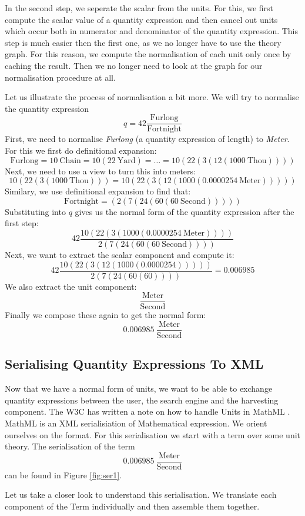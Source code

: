 In the second step, we seperate the scalar from the units. For this, we first compute the scalar value of a quantity expression and then cancel out units which occur both in numerator and denominator of the quantity expression. This step is much easier then the first one, as we no longer have to use the theory graph. For this reason, we compute the normalisation of each unit only once by caching the result. Then we no longer need to look at the graph for our normalisation procedure at all.

Let us illustrate the process of normalisation a bit more. We will try to normalise the quantity expression
\[q = 42 \frac{\text{Furlong}}{\text{Fortnight}}\]
First, we need to normalise \textit{Furlong} (a quantity expression of length) to \textit{Meter}. For this we first do definitional expansion:
\[\text{Furlong} = 10\ \text{Chain} = 10 \left( 22\ \text{Yard}\right) = \dots = 10 \left( 22 \left( 3 \left( 12 \left( 1000\ \text{Thou} \right) \right) \right)\right) \]
Next, we need to use a view to turn this into meters:
\[10 \left( 22 \left( 3 \left( 1000\ \text{Thou} \right) \right)\right) = 10 \left( 22 \left( 3 \left( 12 \left( 1000 \left( 0.0000254\ \text{Meter} \right) \right) \right) \right)\right)\]
Similary, we use definitional expansion to find that:
\[\text{Fortnight} = \left( 2 \left( 7 \left( 24 \left( 60 \left( 60\ \text{Second} \right) \right) \right) \right) \right) \]
Substituting into $q$ gives us the normal form of the quantity expression after the first step:
\[42 \frac{10 \left( 22 \left( 3 \left( 1000 \left( 0.0000254\ \text{Meter} \right) \right) \right)\right)}{ 2 \left( 7 \left( 24 \left( 60 \left( 60\ \text{Second} \right) \right) \right) \right)}\]
Next, we want to extract the scalar component and compute it:
\[42 \frac{10 \left( 22 \left( 3 \left( 12 \left( 1000 \left( 0.0000254 \right) \right) \right) \right)\right)}{ 2 \left( 7 \left( 24 \left( 60 \left( 60\right) \right) \right) \right)} = 0.006985 \]
We also extract the unit component:
\[\frac{\text{Meter}}{\text{Second}}\]
Finally we compose these again to get the normal form:
\[0.006985\ \frac{\text{Meter}}{\text{Second}}\]

\subsection{Serialising Quantity Expressions To XML}
\label{sec:xml}

Now that we have a normal form of units, we want to be able to exchange quantity expressions between the user, the search engine and the harvesting component. The W3C has written a note on how to handle Units in MathML \cite{W3C:Unitnnote}. MathML is an XML serialisiation of Mathematical expression. We orient ourselves on the format. For this serialisation we start with a term over some unit theory. The serialisation of the term
\[0.006985\ \frac{\text{Meter}}{\text{Second}}\]
can be found in Figure \ref{fig:ser1}.

Let us take a closer look to understand this serialisation. We translate each component of the Term individually and then assemble them together.

